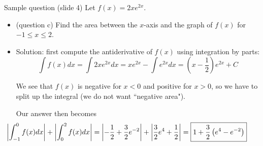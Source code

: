 \begin{frame}{Sample question (slide 4)}
    Let $f(x)=2xe^{2x}$.
    \begin{itemize}
        \item (question c) Find the area between the $x$-axis and the graph of $f(x)$ for $-1\leq x\leq 2$.
        \pause\item Solution: first compute the antiderivative of $f(x)$ using integration by parts: \[\int f(x)dx=\int2xe^{2x}dx=xe^{2x}-\int e^{2x}dx=\left(x-\frac{1}{2}\right)e^{2x}+C\]\pause
        
        We see that $f(x)$ is negative for $x<0$ and positive for $x>0$, so we have to split up the integral (we do not want ``negative area").\pause

        Our answer then becomes \[\hspace{-11mm}\left|\int_{-1}^0 f(x)dx\right|+\left|\int_{0}^{2} f(x)dx\right|=\left|-\frac{1}{2}+\frac{3}{2}e^{-2}\right|+\left|\frac{3}{2}e^4+\frac{1}{2}\right|=\boxed{1+\frac{3}{2}\left(e^4-e^{-2}\right)}\]
    \end{itemize}
    
\end{frame}

